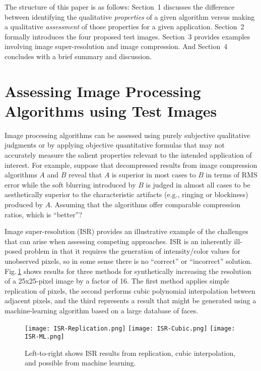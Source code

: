 \documentclass{article}
\begin{document}
The structure of this paper is as follows: Section~1 discusses
the difference between identifying the qualitative {\em properties}
of a given algorithm versus making a qualitative {\em assessment} of those
properties for a given application. Section~2 formally 
introduces the four proposed test images. Section~3
provides examples involving image super-resolution and
image compression. And Section~4 concludes with a 
brief summary and discussion.


\section{Assessing Image Processing Algorithms using Test Images}

Image processing algorithms can be assessed using purely
subjective qualitative judgments or by applying objective quantitative
formulas that may not accurately measure the salient properties
relevant to the intended application of interest. For example, suppose that
decompressed results from image compression algorithms $A$ and $B$
reveal that $A$ is superior in most cases to $B$ in terms of RMS error while
the soft blurring introduced by $B$ is judged in almost all cases to be 
aesthetically superior to the characteristic artifacts (e.g., ringing or 
blockiness) produced by $A$. Assuming that the algorithms offer
comparable compression ratios, which is ``better''? 

Image super-resolution (ISR) provides an illustrative example of 
the challenges that can arise when assessing competing approaches. 
ISR is an inherently ill-posed problem in that it requires the 
generation of intensity/color values for unobserved pixels,
so in some sense there is no ``correct'' or ``incorrect'' 
solution. Fig.\,\ref{marco} shows results for three methods for
synthetically increasing the resolution of a 
25x25-pixel image by a factor of 16.
The first method applies simple replication of pixels, the second
performs cubic polynomial interpolation between adjacent
pixels, and the third represents a result that might be generated
using a machine-learning algorithm based on a large database of
faces.

\begin{figure}
   \centering
   \texttt{[image: ISR-Replication.png]}\vspace{3pt}
   \texttt{[image: ISR-Cubic.png]}\vspace{3pt}
   \texttt{[image: ISR-ML.png]}
\caption{Left-to-right shows ISR results from replication, cubic interpolation, 
and possible from machine learning.}
\label{marco}
\end{figure}
\end{document}

